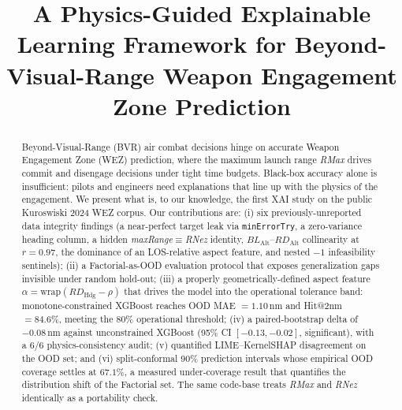 \documentclass[conference]{IEEEtran}
\begin{document}
\title{A Physics-Guided Explainable Learning Framework for Beyond-Visual-Range Weapon Engagement Zone Prediction}

\author{
}

\maketitle

\begin{abstract}
Beyond-Visual-Range (BVR) air combat decisions hinge on accurate Weapon Engagement Zone (WEZ) prediction, where the maximum launch range \textit{RMax} drives commit and disengage decisions under tight time budgets. Black-box accuracy alone is insufficient: pilots and engineers need explanations that line up with the physics of the engagement. We present what is, to our knowledge, the first XAI study on the public Kuroswiski 2024 WEZ corpus. Our contributions are: (i) six previously-unreported data integrity findings (a near-perfect target leak via \texttt{minErrorTry}, a zero-variance heading column, a hidden \textit{maxRange}$\equiv$\textit{RNez} identity, $BL_{\text{Alt}}$--$RD_{\text{Alt}}$ collinearity at $r{=}0.97$, the dominance of an LOS-relative aspect feature, and nested $-1$ infeasibility sentinels); (ii) a Factorial-as-OOD evaluation protocol that exposes generalization gaps invisible under random hold-out; (iii) a properly geometrically-defined aspect feature $\alpha = \mathrm{wrap}(RD_{\text{Hdg}} - \rho)$ that drives the model into the operational tolerance band: monotone-constrained XGBoost reaches OOD MAE $=1.10$\,nm and Hit@2nm $=84.6\%$, meeting the $80\%$ operational threshold; (iv) a paired-bootstrap delta of $-0.08$\,nm against unconstrained XGBoost (95\% CI $[-0.13,-0.02]$, significant), with a 6/6 physics-consistency audit; (v) quantified LIME--KernelSHAP disagreement on the OOD set; and (vi) split-conformal 90\% prediction intervals whose empirical OOD coverage settles at $67.1\%$, a measured under-coverage result that quantifies the distribution shift of the Factorial set. The same code-base treats \textit{RMax} and \textit{RNez} identically as a portability check.
\end{abstract}
\end{document}
